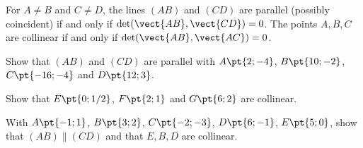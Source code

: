 \begin{keypoint}[Applications]
For $A\ne B$ and $C\ne D$, the lines $(AB)$ and $(CD)$ are parallel (possibly coincident) if and only if $\det(\vect{AB},\vect{CD})=0$.
The points $A,B,C$ are collinear if and only if $\det(\vect{AB},\vect{AC})=0$.
\end{keypoint}
\begin{example}Show that $(AB)$ and $(CD)$ are parallel with $A\pt{2;-4}$, $B\pt{10;-2}$, $C\pt{-16;-4}$ and $D\pt{12;3}$.\end{example}
\begin{example}Show that $E\pt{0;1/2}$, $F\pt{2;1}$ and $G\pt{6;2}$ are collinear.\end{example}
\begin{example}With $A\pt{-1;1}$, $B\pt{3;2}$, $C\pt{-2;-3}$, $D\pt{6;-1}$, $E\pt{5;0}$, show that $(AB)\parallel(CD)$ and that $E,B,D$ are collinear.\end{example}

